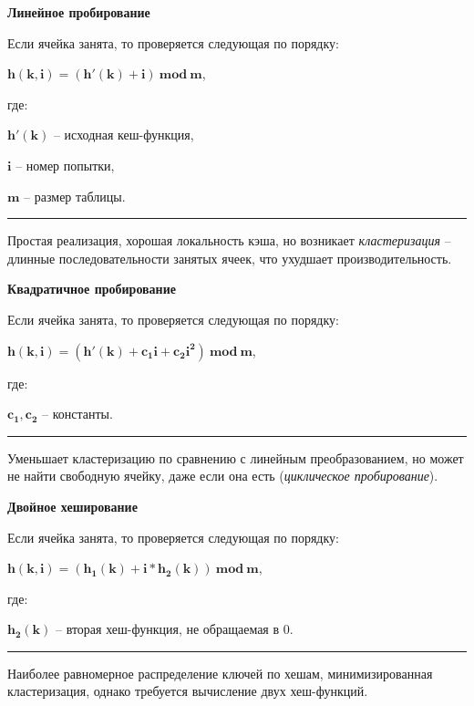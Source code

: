 \begin{minipage}[t]{0.30\textwidth}
	\fontsize{8.5pt}{11pt}\selectfont
	\centerline{\small \textbf{Линейное пробирование}}\par

	Если ячейка занята, то проверяется следующая по порядку:\par
	\vspace{2pt}
	$\boldsymbol{h(k, i) = (h'(k) + i) \ mod \ m}$,\par
	\vspace{2pt}
	где:\par
	$\boldsymbol{h'(k)}$ -- исходная кеш-функция,\par
	$\boldsymbol{i}$ -- номер попытки,\par
	$\boldsymbol{m}$ -- размер таблицы.	

	\vspace{6pt}
	\hrule
	\vspace{6pt}

	Простая реализация, хорошая локальность кэша, но возникает \textit{кластеризация} -- длинные последовательности занятых ячеек, что ухудшает производительность.
\end{minipage}
\hfill
\begin{minipage}[t]{0.30\textwidth}
	\fontsize{8.5pt}{11pt}\selectfont
	\centerline{\small \textbf{Квадратичное пробирование}}\par

	Если ячейка занята, то проверяется следующая по порядку:\par
	\vspace{2pt}
	$\boldsymbol{h(k, i) = (h'(k) +  c_{1}i + c_{2}i^{2}) \ mod \ m}$,\par
	\vspace{2pt}
	где:\par
	$\boldsymbol{c_1, c_2}$ -- константы.

	\vspace{28pt}
	\hrule
	\vspace{6pt}

	Уменьшает кластеризацию по сравнению с линейным преобразованием, но может не найти свободную ячейку, даже если она есть (\textit{циклическое пробирование}).
\end{minipage}
\hfill
\begin{minipage}[t]{0.30\textwidth}
	\fontsize{8.5pt}{11pt}\selectfont
	\centerline{\small \textbf{Двойное хеширование}}\par

	Если ячейка занята, то проверяется следующая по порядку:\par
	\vspace{2pt}
	$\boldsymbol{h(k, i) = (h_{1}(k) +  i*h_{2}(k)) \ mod \ m}$,\par
	\vspace{2pt}
	где:\par
	$\boldsymbol{h_{2}(k)}$ -- вторая хеш-функция, не обращаемая в $0$.

	\vspace{17pt}
	\hrule
	\vspace{6pt}

	Наиболее равномерное распределение ключей по хешам, минимизированная кластеризация, однако требуется вычисление двух хеш-функций.
\end{minipage}
